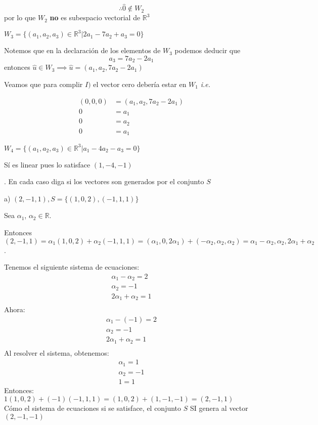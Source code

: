 \documentclass[letterpaper]{article}
\newcommand{\R}{\mathds{R}}
\renewcommand{\*}{\cdot}
\theoremstyle{definition}
\begin{document}
\begin{tasks}
\[ \therefore \hat{0} \notin W_2  \] por lo que $ W_2 $ \textbf{no} es subespacio vectorial de $ \R^3 $


\task $W_{3} = \lbrace (a_{1},a_{2},a_{3}) \in \mathbb{R}^{3} \big\vert  2a_{1} - 7a_{2} + a_{3} = 0 \rbrace$

Notemos que en la declaración de los elementos de $ W_3 $ podemos deducir que \[ a_3 = 7a_2 - 2 a_1 \] entonces $ \hat{u} \in W_3 \implies \hat{u} = (a_1, a_2, 7a_2 - 2a_1)  $

Veamos que para complir $ I) $ el vector cero debería estar en $ W_1 $ \textit{i.e.} 

\begin{align*}
	(0,0,0) &= (a_1, a_2, 7a_2 - 2 a_1) \\
	0 &=  a_1\\
	0 &=  a_2\\
	0 &=  a_1
\end{align*}

\task $W_{4} = \lbrace (a_{1},a_{2},a_{3}) \in \mathbb{R}^{3} \big\vert  a_{1} - 4a_{2} - a_{3} = 0 \rbrace$

Sí es linear pues lo satisface $(1,-4,-1)$

\end{tasks}


. En cada caso diga si los vectores son generados por el conjunto $S$


a) $(2,-1,1), S =  \lbrace (1,0,2),(-1,1,1) \rbrace$

Sea $\alpha _1$, $\alpha _2 \in \mathbb{R}$.

Entonces $(2,-1,1) = \alpha _{1}(1,0,2) + \alpha _{2}(-1,1,1) = (\alpha _{1}, 0, 2\alpha _{1})+ (-\alpha _{2},\alpha _{2},\alpha _{2}) = \alpha _{1}-\alpha _{2},\alpha _{2},2\alpha _{1}+\alpha _{2}$.

Tenemos el siguiente sistema de ecuaciones:
\begin{eqnarray*}
\alpha_{1}-\alpha_{2}= 2 \\
\alpha_{2} = -1\\
2\alpha_{1}+\alpha_{2}=1\\
\end{eqnarray*}
Ahora:
\begin{eqnarray*}
\alpha_{1} -(-1)=2 \\
\alpha_{2}=-1\\
2\alpha_{1} + \alpha_{2} = 1\\
\end{eqnarray*}
Al resolver el sistema, obtenemos:
\begin{eqnarray*}
\alpha_{1}=1 \\
\alpha_{2} = -1 \\
1 = 1
\end{eqnarray*}
Entonces:\\ $1(1,0,2) + (-1)(-1,1,1) = (1,0,2) + (1,-1,-1) = (2,-1,1)$\\
Cómo el sistema de ecuaciones si se satisface, el conjunto $S$ SI genera al vector $(2,-1,-1)$\\ \\
\end{document}
